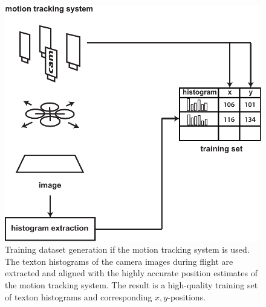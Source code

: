 \documentclass{report}
\begin{document}
\begin{figure}[h!]
\begin{center}
\includegraphics[width=0.56\columnwidth]{overview_new}
\caption{{Training dataset generation if the motion tracking system is
    used. The texton histograms of the camera images during flight are
    extracted and aligned with the highly accurate position estimates
    of the motion tracking system. The result is a high-quality
    training set of texton histograms and corresponding
    $x,y$-positions.%
  }}
\end{center}
\end{figure}
\end{document}
